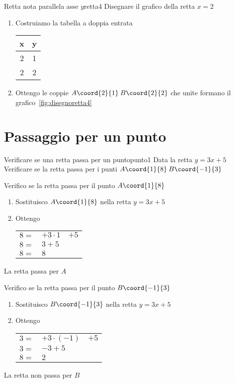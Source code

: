 \begin{esempiot}{Retta nota parallela asse $y$}{retta4}
	Disegnare il grafico della retta $x=2$
\end{esempiot}
\begin{enumerate}
	\item Costruiamo la tabella a doppia entrata 
	\begin{tabular}{c|c}
		x & y\\
		\hline 
		2&1\\ 
		2&2\\ 
	\end{tabular}
	\item Ottengo le coppie $A\coord{2}{1}$\,$B\coord{2}{2}$ che unite formano il grafico~\vref{fig:disegnoretta4}
\end{enumerate}
\begin{center}
	
	\label{fig:disegnoretta4}
\end{center}
\section{Passaggio per un punto}
\begin{esempiot}{Verificare se una retta passa per un punto}{punto1}
Data la retta $y=3x+5$ Verificare se la retta passa per i punti $A\coord{1}{8}$\,$B\coord{-1}{3}$
\end{esempiot}
Verifico se la retta passa per il punto $A\coord{1}{8}$ 
\begin{enumerate}
	\item Sostituisco $A\coord{1}{8}$ nella retta $y=3x+5$ 
	\item Ottengo  \begin{tabular}{rll}
		$8=$&$+3\cdot 1$ &$+5$  \\ 
		$8=$&$3+5$  \\ 
		$8=$&$8$  \\ 
	\end{tabular}
\end{enumerate}	
	La retta passa per $A$
	
Verifico se la retta passa per il punto $B\coord{-1}{3}$
\begin{enumerate}
	\item Sostituisco $B\coord{-1}{3}$ nella retta $y=3x+5$ 
	\item Ottengo  \begin{tabular}{rll}
		$3=$&$+3\cdot (-1)$ &$+5$  \\ 
		$3=$&$-3+5$  \\ 
		$8=$&$2$  \\ 
	\end{tabular}
\end{enumerate}	
La retta non passa per $B$ 
